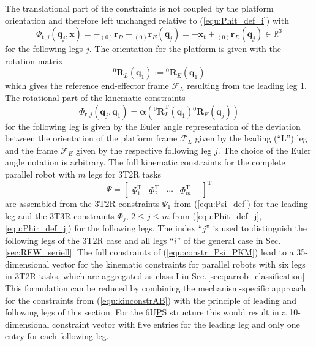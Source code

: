 \documentclass[robotics,article,submit,moreauthors,pdftex]{Definitions/mdpi}
\newcommand{\bm}[1]{\boldsymbol{#1}}
\newcommand{\ortvek}[4]{{ }_{(#1)}{\boldsymbol{#2}}^{#3}_{#4} }
\newcommand{\rotmat}[2]{{{ }^{#1}\boldsymbol{R}}_{#2}}
\newcommand{\transp}[0]{{\mathrm{T}}}
\newcommand{\ks}[1]{{\mathcal{F}}_{#1}}
\let\Phi\varPhi
\let\Psi\varPsi
\begin{document}
The translational part of the constraints is not coupled by the platform orientation and therefore left unchanged relative to (\ref{equ:Phit_def_i}) with
%
\begin{equation}
\bm{\Phi}_{\mathrm{t},j}(\bm{q}_j,\bm{x})
= 
- \ortvek{0}{r}{}{D} + \ortvek{0}{r}{}{E}(\bm{q}_j)
=
- \bm{x}_{\mathrm{t}} + \ortvek{0}{r}{}{E}(\bm{q}_j) \in {\mathbb{R}}^{3}
\label{equ:Phit_def_j}
\end{equation}
%
for the following legs $j$.
% 
The orientation for the platform is given with the rotation matrix
%
\begin{equation}
\rotmat{0}{L}(\bm{q}_1)
:= 
\rotmat{0}{E}(\bm{q}_1)
\end{equation}
%
which gives the reference end-effector frame $\ks{L}$ resulting from the leading leg 1.
The rotational part of the kinematic constraints
%
\begin{equation}
\bm{\Phi}_{\mathrm{r},j}(\bm{q}_j,\bm{q}_1)
=
\bm{\alpha}(\rotmat{0}{L}^\mathrm{T}(\bm{q}_1)\rotmat{0}{E}(\bm{q}_j))
\label{equ:Phir_def_j}
\end{equation}
%
for the following leg is given by the Euler angle representation of the deviation between the orientation of the platform frame $\ks{L}$ given by the leading (``L'') leg and the frame $\ks{E}$ given by the respective following leg $j$.
The choice of the Euler angle notation is arbitrary.
The full kinematic constraints for the complete parallel robot with $m$ legs for 3T2R tasks
%
\begin{equation}
\bm{\Psi}
=
\begin{bmatrix}
\bm{\Psi}_1^\transp &
\bm{\Phi}_2^\transp &
\cdots &
\bm{\Phi}_m^\transp &
\end{bmatrix}^\transp
\label{equ:constr_Psi_PKM}
\end{equation}
%
are assembled from the 3T2R constraints $\bm{\Psi}_1$ from (\ref{equ:Psi_def}) for the leading leg and the 3T3R constraints $\bm{\Phi}_j$, $2\le{}j\le{}m$ from (\ref{equ:Phit_def_j},\ref{equ:Phir_def_j}) for the following legs.
The index ``$j$'' is used to distinguish the following legs of the 3T2R case and all legs ``$i$'' of the general case in Sec.\,\ref{sec:REW_seriell}.
%
The full constraints of (\ref{equ:constr_Psi_PKM}) lead to a 35-dimensional vector for the kinematic constraints for parallel robots with six legs in 3T2R tasks, which are aggregated as class I in Sec.\,\ref{sec:parrob_classification}.
This formulation can be reduced by combining the mechanism-specific approach for the constraints from (\ref{equ:kinconstrAB}) with the principle of leading and following legs of this section.
For the 6U\underline{P}S structure this would result in a 10-dimensional constraint vector with five entries for the leading leg and only one entry for each following leg.
\end{document}
